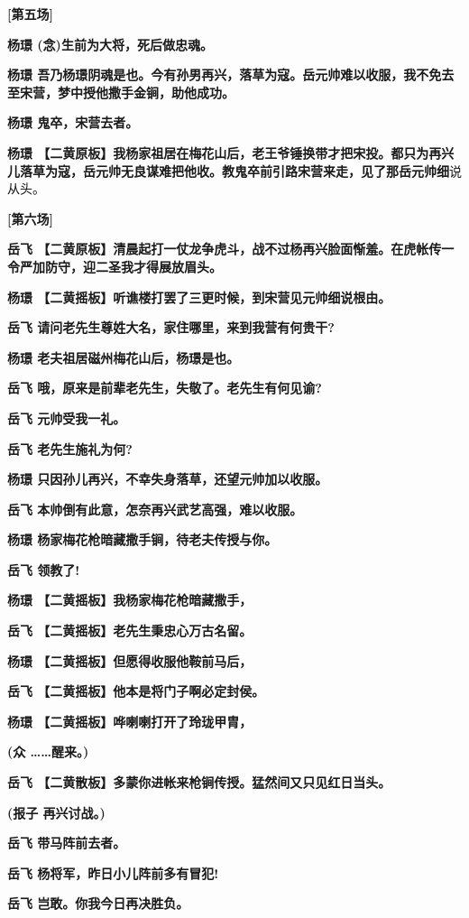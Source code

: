 \textbf{{[}第五场{]}}

\textbf{杨璟 (念)生前为大将，死后做忠魂。}

\textbf{杨璟
吾乃杨璟阴魂是也。今有孙男再兴，落草为寇。岳元帅难以收服，我不免去至宋营，梦中授他撒手金锏，助他成功。}

\textbf{杨璟 鬼卒，宋营去者。}

\textbf{杨璟
【二黄原板】我杨家祖居在梅花山后，老王爷锤换带才把宋投。都只为再兴儿落草为寇，岳元帅无良谋难把他收。教鬼卒前引路宋营来走，见了那岳元帅细}说从头。

\textbf{{[}第六场{]}}

\textbf{岳飞
【二黄原板】清晨起打一仗龙争虎斗，战不过杨再兴脸面惭羞。在虎帐传一令严加防守，迎二圣我才得展放眉头。}

\textbf{杨璟 【二黄摇板】听谯楼打罢了三更时候，到宋营见元帅细说根由。}

\textbf{岳飞 请问老先生尊姓大名，家住哪里，来到我营有何贵干?}

\textbf{杨璟 老夫祖居磁州梅花山后，杨璟是也。}

\textbf{岳飞 哦，原来是前辈老先生，失敬了。老先生有何见谕?}

\textbf{岳飞 元帅受我一礼。}

\textbf{岳飞 老先生施礼为何?}

\textbf{杨璟 只因孙儿再兴，不幸失身落草，还望元帅加以收服。}

\textbf{岳飞 本帅倒有此意，怎奈再兴武艺高强，难以收服。}

\textbf{杨璟 杨家梅花枪暗藏撒手锏，待老夫传授与你。}

\textbf{岳飞 领教了!}

\textbf{杨璟 【二黄摇板】我杨家梅花枪暗藏撒手，}

\textbf{岳飞 【二黄摇板】老先生秉忠心万古名留。}

\textbf{杨璟 【二黄摇板】但愿得收服他鞍前马后，}

\textbf{岳飞 【二黄摇板】他本是将门子啊必定封侯。}

\textbf{杨璟 【二黄摇板】哗喇喇打开了玲珑甲胄，}

\textbf{(众 \ldots{}\ldots{}醒来。)}

\textbf{岳飞 【二黄散板】多蒙你进帐来枪锏传授。猛然间又只见红日当头。}

\textbf{(报子 再兴讨战。)}

\textbf{岳飞 带马阵前去者。}

\textbf{岳飞 杨将军，昨日小儿阵前多有冒犯!}

\textbf{岳飞 岂敢。你我今日再决胜负。}

